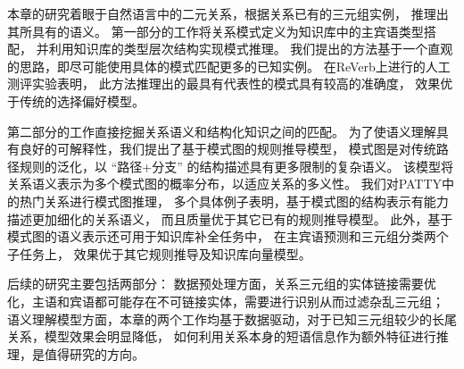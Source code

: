 本章的研究着眼于自然语言中的二元关系，根据关系已有的三元组实例，
推理出其所具有的语义。
第一部分的工作将关系模式定义为知识库中的主宾语类型搭配，
并利用知识库的类型层次结构实现模式推理。
我们提出的方法基于一个直观的思路，即尽可能使用具体的模式匹配更多的已知实例。
在ReVerb上进行的人工测评实验表明，
此方法推理出的最具有代表性的模式具有较高的准确度，
效果优于传统的选择偏好模型。

第二部分的工作直接挖掘关系语义和结构化知识之间的匹配。
为了使语义理解具有良好的可解释性，我们提出了基于模式图的规则推导模型，
模式图是对传统路径规则的泛化，以 ``{路径+分支}'' 的结构描述具有更多限制的复杂语义。
该模型将关系语义表示为多个模式图的概率分布，以适应关系的多义性。
我们对PATTY中的热门关系进行模式图推理，
多个具体例子表明，基于模式图的结构表示有能力描述更加细化的关系语义，
而且质量优于其它已有的规则推导模型。
此外，基于模式图的语义表示还可用于知识库补全任务中，
在主宾语预测和三元组分类两个子任务上，
效果优于其它规则推导及知识库向量模型。

后续的研究主要包括两部分：
数据预处理方面，关系三元组的实体链接需要优化，主语和宾语都可能存在不可链接实体，需要进行识别从而过滤杂乱三元组；
语义理解模型方面，本章的两个工作均基于数据驱动，对于已知三元组较少的长尾关系，模型效果会明显降低，
如何利用关系本身的短语信息作为额外特征进行推理，是值得研究的方向。


